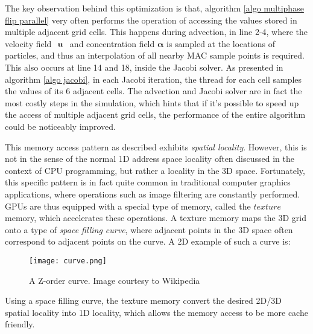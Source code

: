 The key observation behind this optimization is that, algorithm \ref{algo multiphase flip parallel} very often performs the operation of accessing the values stored in multiple adjacent grid cells. This happens during advection, in line 2-4, where the velocity field $\textbf{ \textbf{u} }$ and concentration field $\bm{\alpha}$ is sampled at the locations of particles, and thus an interpolation of all nearby MAC sample points is required. This also occurs at line 14 and 18, inside the Jacobi solver. As presented in algorithm \ref{algo jacobi}, in each Jacobi iteration, the thread for each cell samples the values of its 6 adjacent cells. The advection and Jacobi solver are in fact the most costly steps in the simulation, which hints that if it's possible to speed up the access of multiple adjacent grid cells, the performance of the entire algorithm could be noticeably improved.

This memory access pattern as described exhibits \textit{spatial locality}. However, this is not in the sense of the normal 1D address space locality often discussed in the context of CPU programming, but rather a locality in the 3D space. Fortunately, this specific pattern is in fact quite common in traditional computer graphics applications, where operations such as image filtering are constantly performed. GPUs are thus equipped with a special type of memory, called the $texture$ memory, which accelerates these operations. A texture memory maps the 3D grid onto a type of \textit{space filling curve}, where adjacent points in the 3D space often correspond to adjacent points on the curve. A 2D example of such a curve is:

\begin{figure}[H]
    \centering
        \texttt{[image: curve.png]}
    \caption{A Z-order curve. Image courtesy to Wikipedia}
    \label{}
\end{figure}

Using a space filling curve, the texture memory convert the desired 2D/3D spatial locality into 1D locality, which allows the memory access to be more cache friendly. 


